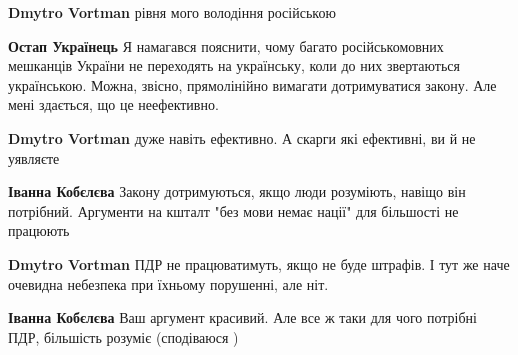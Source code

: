 \begin{itemize}
\begin{itemize}
\textbf{Dmytro Vortman} рівня мого володіння російською

 
\textbf{Остап Українець} Я намагався пояснити, чому багато російськомовних
мешканців України не переходять на українську, коли до них звертаються
українською. Можна, звісно, прямолінійно вимагати дотримуватися закону. Але
мені здається, що це неефективно.

 
\textbf{Dmytro Vortman} дуже навіть ефективно. А скарги які ефективні, ви й не уявляєте

 
\textbf{Іванна Кобєлєва} Закону дотримуються, якщо люди розуміють, навіщо він потрібний. Аргументи на кшталт "без мови немає нації" для більшості не працюють

 
\textbf{Dmytro Vortman} ПДР не працюватимуть, якщо не буде штрафів. І тут же наче очевидна небезпека при їхньому порушенні, але ніт.

 
\textbf{Іванна Кобєлєва} Ваш аргумент красивий. Але все ж таки для чого потрібні ПДР, більшість розуміє (сподіваюся \Smiley[1.0][yellow] )

 

\end{itemize}
\end{itemize}
